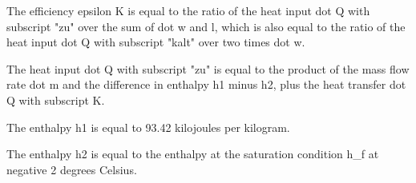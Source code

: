 The efficiency epsilon K is equal to the ratio of the heat input dot Q with subscript "zu" over the sum of dot w and l, which is also equal to the ratio of the heat input dot Q with subscript "kalt" over two times dot w. 

The heat input dot Q with subscript "zu" is equal to the product of the mass flow rate dot m and the difference in enthalpy h1 minus h2, plus the heat transfer dot Q with subscript K.

The enthalpy h1 is equal to 93.42 kilojoules per kilogram.

The enthalpy h2 is equal to the enthalpy at the saturation condition h_f at negative 2 degrees Celsius.
